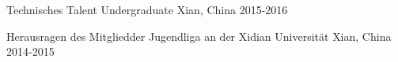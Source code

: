 \begin{cvhonors}
  \cvhonor
	{Technisches Talent Undergraduate} %
	{} %
	{Xian, China} %
	{2015-2016} %

  \cvhonor
	{Herausragen des Mitgliedder Jugendliga an der Xidian Universität} %
	{} %
	{Xian, China} %
	{2014-2015} %





\end{cvhonors}
